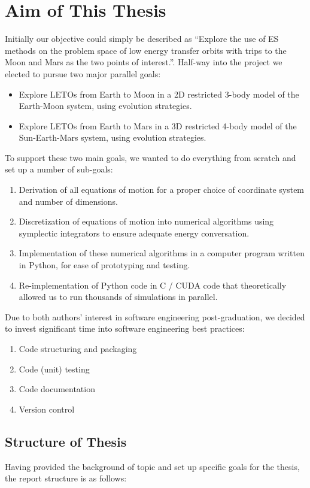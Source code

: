 \section{Aim of This Thesis}
Initially our objective could simply be described as ``Explore the use of ES methods on the problem space of low energy transfer orbits with trips to the Moon and Mars as the two points of interest.''. Half-way into the project we elected to pursue two major parallel goals:
\begin{itemize}
	\item Explore LETOs from Earth to Moon in a 2D restricted 3-body model of the Earth-Moon system, using evolution strategies.
	\item Explore LETOs from Earth to Mars in a 3D restricted 4-body model of the Sun-Earth-Mars system, using evolution strategies.
\end{itemize}
To support these two main goals, we wanted to do everything from scratch and set up a number of sub-goals:
\begin{enumerate}
	\item Derivation of all equations of motion for a proper choice of coordinate system and number of dimensions.
	\item Discretization of equations of motion into numerical algorithms using symplectic integrators to ensure adequate energy conversation.
	\item Implementation of these numerical algorithms in a computer program written in Python, for ease of prototyping and testing.
	\item Re-implementation of Python code in C / CUDA code that theoretically allowed us to run thousands of simulations in parallel.
\end{enumerate}
Due to both authors' interest in software engineering post-graduation, we decided to invest significant time into software engineering best practices:
\begin{enumerate}
	\item Code structuring and packaging
	\item Code (unit) testing 
	\item Code documentation
	\item Version control
\end{enumerate}

\subsection{Structure of Thesis}
Having provided the background of topic and set up specific goals for the thesis, the report structure is as follows:

